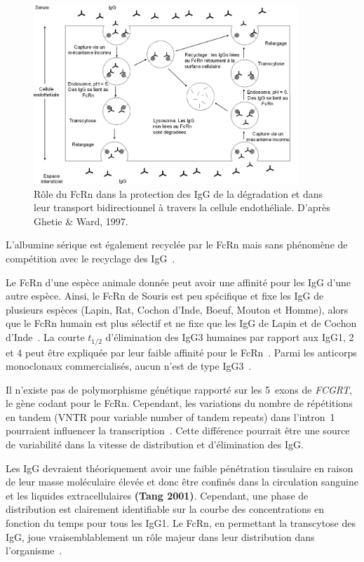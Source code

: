\begin{figure}[htbp]
	\centering
		\includegraphics[width=10cm]{figures/raster/FIG_14}
	\caption[Rôle du FcRn]{Rôle du FcRn dans la protection des IgG de la dégradation et dans leur transport bidirectionnel à travers la cellule endothéliale. D'après Ghetie \& Ward, 1997.}
	\label{fig:14}
\end{figure}

L'albumine sérique est également recyclée par le FcRn mais sans phénomène de compétition avec le recyclage des IgG~\citep{REF38}.

Le FcRn d'une espèce animale donnée peut avoir une affinité pour les IgG d'une autre espèce. Ainsi, le FcRn de Souris est peu spécifique et fixe les IgG de plusieurs espèces (Lapin, Rat, Cochon d'Inde, Boeuf, Mouton et Homme), alors que le FcRn humain est plus sélectif et ne fixe que les IgG de Lapin et de Cochon d'Inde~\citep{REF36}. La courte $t_{1/2}$ d'élimination des IgG3 humaines par rapport aux IgG1, 2 et 4 peut être expliquée par leur faible affinité pour le FcRn~\citep{REF35}. Parmi les anticorps monoclonaux commercialisés, aucun n'est de type IgG3~\citep{REF39}.

Il n'existe pas de polymorphisme génétique rapporté sur les 5~exons de \textit{FCGRT}, le gène codant pour le FcRn. Cependant, les variations du nombre de répétitions en tandem (VNTR pour variable number of tandem repeats) dans l'intron~1 pourraient influencer la transcription~\citep{REF40}. Cette différence pourrait être une source de variabilité dans la vitesse de distribution et d'élimination des IgG.

Les IgG devraient théoriquement avoir une faible pénétration tissulaire en raison de leur masse moléculaire élevée et donc être confinés dans la circulation sanguine et les liquides extracellulaires \textbf{(Tang 2001)}. Cependant, une phase de distribution est clairement identifiable sur la courbe des concentrations en fonction du temps pour tous les IgG1. Le FcRn, en permettant la transcytose des IgG, joue vraisemblablement un rôle majeur dans leur distribution dans l'organisme~\citep{REF31, REF41}.

